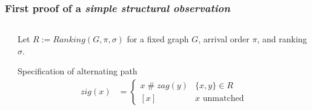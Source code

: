 \documentclass{beamer}
\newcommand{\cons}{\mathbin{\#}}
\begin{document}
\begin{frame}
  \frametitle{First proof of a \emph{simple structural observation}}
  \begin{columns}
    \begin{column}{.3\textwidth}
    \end{column}
    \begin{column}{.65\textwidth}
      Let $R := Ranking(G,\pi,\sigma)$ for a fixed graph $G$, arrival order $\pi$, and ranking $\sigma$.
      \begin{alertblock}{Specification of alternating path}
      \begin{align*}
        zig(x) &=
          \begin{cases}
            x \cons zag(y) & \{x,y\} \in R \\
            [x] & x \text{ unmatched}
          \end{cases} \\\\

\end{align*}
\end{alertblock}
\end{column}
\end{columns}
\end{frame}
\end{document}
